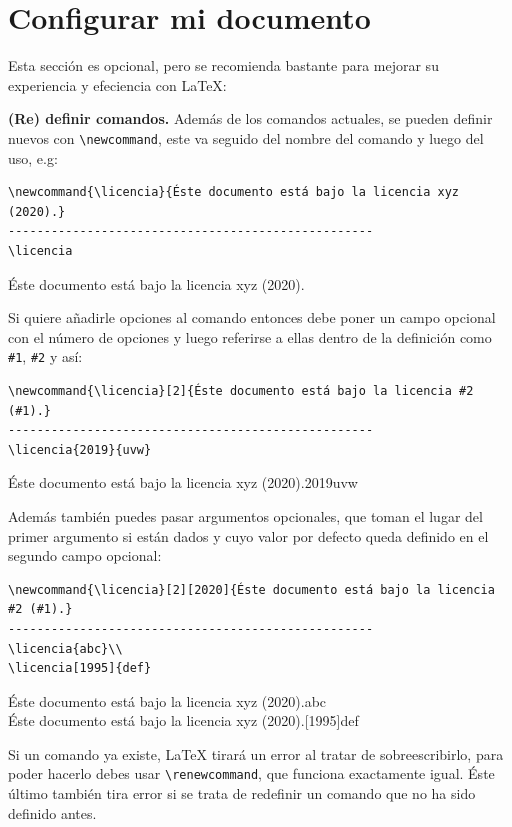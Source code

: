 \section{Configurar mi documento}
\label{sec:setup}
Esta sección es opcional, pero se recomienda bastante para mejorar su experiencia y efeciencia con \LaTeX{}:

\textbf{(Re) definir comandos.} Además de los comandos actuales, se pueden definir nuevos con \lstinline|\newcommand|, este va seguido del nombre del comando y luego del uso, e.g:
\begin{lstlisting}
\newcommand{\licencia}{Éste documento está bajo la licencia xyz (2020).}
---------------------------------------------------
\licencia
\end{lstlisting}
\begingroup
\newcommand{\licencia}{Éste documento está bajo la licencia xyz (2020).}
\licencia
\endgroup

Si quiere añadirle opciones al comando entonces debe poner un campo opcional con el número de opciones y luego referirse a ellas dentro de la definición como \lstinline|#1|, \lstinline|#2| y así:
\begin{lstlisting}
\newcommand{\licencia}[2]{Éste documento está bajo la licencia #2 (#1).}
---------------------------------------------------
\licencia{2019}{uvw}
\end{lstlisting}
\begingroup
\newcommand{\licencia}[2]{Éste documento está bajo la licencia #2 (#1).}
\licencia{2019}{uvw}
\endgroup

Además también puedes pasar argumentos opcionales, que toman el lugar del primer argumento si están dados y cuyo valor por defecto queda definido en el segundo campo opcional:
\begin{lstlisting}
\newcommand{\licencia}[2][2020]{Éste documento está bajo la licencia #2 (#1).}
---------------------------------------------------
\licencia{abc}\\
\licencia[1995]{def}
\end{lstlisting}
\begingroup
\newcommand{\licencia}[2][2020]{Éste documento está bajo la licencia #2 (#1).}
\licencia{abc}\\
\licencia[1995]{def}
\endgroup

Si un comando ya existe, \LaTeX{} tirará un error al tratar de sobreescribirlo, para poder hacerlo debes usar \lstinline|\renewcommand|, que funciona exactamente igual. Éste último también tira error si se trata de redefinir un comando que no ha sido definido antes.

